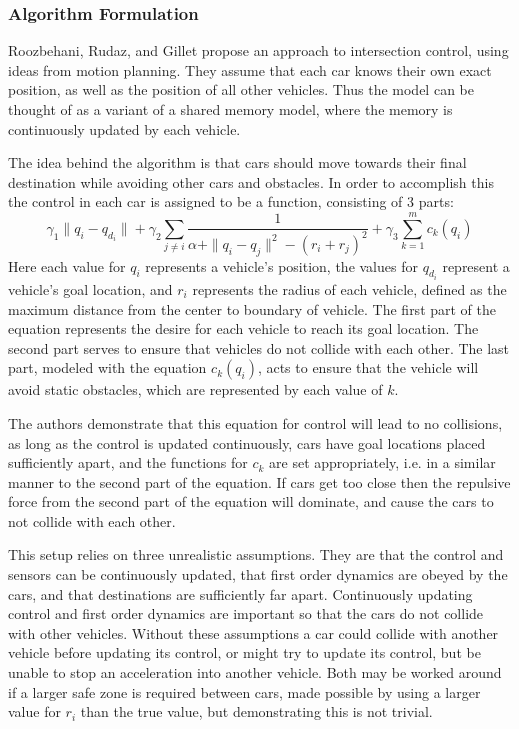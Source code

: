 \documentclass[12pt]{article}
\begin{document}
\subsubsection{Algorithm Formulation}
Roozbehani, Rudaz, and Gillet propose an approach to intersection control, using ideas from motion planning. They assume that each car knows their own exact position, as well as the position of all other vehicles. Thus the model can be thought of as a variant of a shared memory model, where the memory is continuously updated by each vehicle. \par
The idea behind the algorithm is that cars should move towards their final destination while avoiding other cars and obstacles. In order to accomplish this the control in each car is assigned to be a function, consisting of 3 parts:
\begin{equation}
\gamma_1\|q_i - q_{d_i}\| + \gamma_2\sum_{j \neq i} \frac{1}{\alpha + \|q_i - q_j\|^2 - (r_i + r_j)^2} + \gamma_3\sum_{k=1}^m c_k(q_i)
\end{equation}
Here each value for $q_i$ represents a vehicle's position, the values for $q_{d_i}$ represent a vehicle's goal location, and $r_i$ represents the radius of each vehicle, defined as the maximum distance from the center to boundary of vehicle. The first part of the equation represents the desire for each vehicle to reach its goal location. The second part serves to ensure that vehicles do not collide with each other. The last part, modeled with the equation $c_k(q_i)$, acts to ensure that the vehicle will avoid static obstacles, which are represented by each value of $k$.\par
The authors demonstrate that this equation for control will lead to no collisions, as long as the control is updated continuously, cars have goal locations placed sufficiently apart, and the functions for $c_k$ are set appropriately, i.e. in a similar manner to the second part of the equation. If cars get too close then the repulsive force from the second part of the equation will dominate, and cause the cars to not collide with each other. \par
This setup relies on three unrealistic assumptions. They are that the control and sensors can be continuously updated, that first order dynamics are obeyed by the cars, and that destinations are sufficiently far apart. Continuously updating control and first order dynamics are important so that the cars do not collide with other vehicles. Without  these assumptions a car could collide with another vehicle before updating its control, or might try to update its control, but be unable to stop an acceleration into another vehicle. Both may be worked around if a larger safe zone is required between cars, made possible by using a larger value for $r_i$ than the true value, but demonstrating this is not trivial. \par
\end{document}
